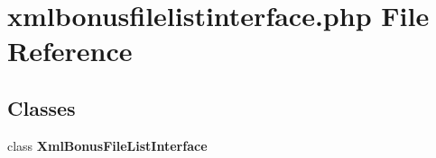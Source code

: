 \section{xmlbonusfilelistinterface.php File Reference}
\label{xmlbonusfilelistinterface_8php}


\subsection*{Classes}
\begin{CompactItemize}
\item 
class {\bf Xml\-Bonus\-File\-List\-Interface}
\end{CompactItemize}
